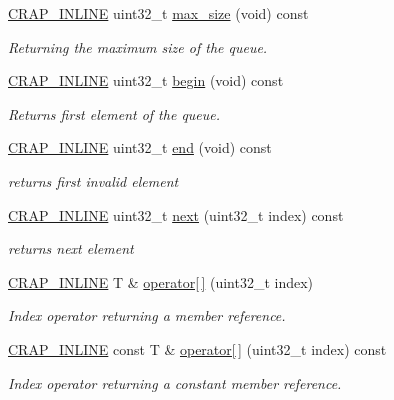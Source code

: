 \begin{DoxyCompactItemize}
\hyperlink{config__x86_8h_a5a40526b8d842e7ff731509998bb0f1c}{C\+R\+A\+P\+\_\+\+I\+N\+L\+I\+N\+E} uint32\+\_\+t \hyperlink{classcrap_1_1queue_af097f79db1c3b3400f8b503debdef410}{max\+\_\+size} (void) const 
\begin{DoxyCompactList}\small\item\em Returning the maximum size of the queue. \end{DoxyCompactList}\item 
\hyperlink{config__x86_8h_a5a40526b8d842e7ff731509998bb0f1c}{C\+R\+A\+P\+\_\+\+I\+N\+L\+I\+N\+E} uint32\+\_\+t \hyperlink{classcrap_1_1queue_a32a47bbe83b1547f42ea24df382a18cc}{begin} (void) const 
\begin{DoxyCompactList}\small\item\em Returns first element of the queue. \end{DoxyCompactList}\item 
\hyperlink{config__x86_8h_a5a40526b8d842e7ff731509998bb0f1c}{C\+R\+A\+P\+\_\+\+I\+N\+L\+I\+N\+E} uint32\+\_\+t \hyperlink{classcrap_1_1queue_a1aad1cf2d26f9da15d52417a5c3f65f7}{end} (void) const 
\begin{DoxyCompactList}\small\item\em returns first invalid element \end{DoxyCompactList}\item 
\hyperlink{config__x86_8h_a5a40526b8d842e7ff731509998bb0f1c}{C\+R\+A\+P\+\_\+\+I\+N\+L\+I\+N\+E} uint32\+\_\+t \hyperlink{classcrap_1_1queue_a6219623400146bc09562109884f8328a}{next} (uint32\+\_\+t index) const 
\begin{DoxyCompactList}\small\item\em returns next element \end{DoxyCompactList}\item 
\hyperlink{config__x86_8h_a5a40526b8d842e7ff731509998bb0f1c}{C\+R\+A\+P\+\_\+\+I\+N\+L\+I\+N\+E} T \& \hyperlink{classcrap_1_1queue_a20e2eaac1e0ff2cb4f6227fc4ae930c7}{operator\mbox{[}$\,$\mbox{]}} (uint32\+\_\+t index)
\begin{DoxyCompactList}\small\item\em Index operator returning a member reference. \end{DoxyCompactList}\item 
\hyperlink{config__x86_8h_a5a40526b8d842e7ff731509998bb0f1c}{C\+R\+A\+P\+\_\+\+I\+N\+L\+I\+N\+E} const T \& \hyperlink{classcrap_1_1queue_ab66f525bafecbd2e94170319c3471266}{operator\mbox{[}$\,$\mbox{]}} (uint32\+\_\+t index) const 
\begin{DoxyCompactList}\small\item\em Index operator returning a constant member reference. \end{DoxyCompactList}\item 

\end{DoxyCompactItemize}
